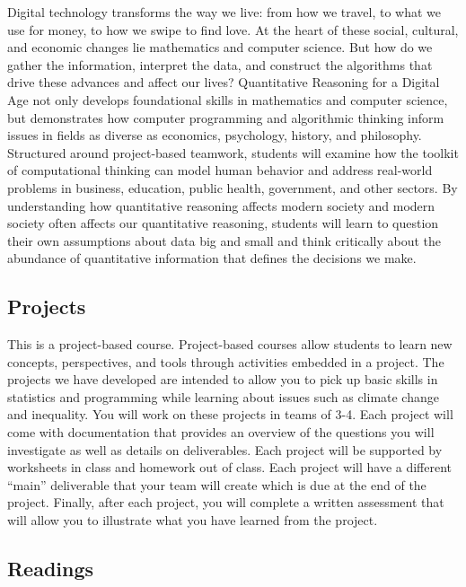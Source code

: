 \documentclass[
]{article}
\begin{document}
Digital technology transforms the way we live: from how we travel, to what we use for money, to how we swipe to find love.
At the heart of these social, cultural, and economic changes lie mathematics and computer science. But how do we gather the information, interpret the data, and construct the algorithms that drive these advances and affect our lives? Quantitative Reasoning for a Digital Age not only develops foundational skills in mathematics and computer science, but demonstrates how computer programming and algorithmic thinking inform issues in fields as diverse as economics, psychology, history, and philosophy. Structured around project-based teamwork, students will examine how the toolkit of computational thinking can model human behavior and address real-world problems in business, education, public health, government, and other sectors. By understanding how quantitative reasoning affects modern society and modern society often affects our quantitative reasoning, students will learn to question their own assumptions about data big and small and think critically about the abundance of quantitative information that defines the decisions we make.

\hypertarget{projects}{%
\subsection*{Projects}\label{projects}}

This is a project-based course. Project-based courses allow students to learn new concepts, perspectives, and tools through activities embedded in a project. The projects we have developed are intended to allow you to pick up basic skills in statistics and programming while learning about issues such as climate change and inequality.
You will work on these projects in teams of 3-4. Each project will come with documentation that provides an overview of the questions you will investigate as well as details on deliverables. Each project will be supported by worksheets in class and homework out of class. Each project will have a different ``main'' deliverable that your team will create which is due at the end of the project. Finally, after each project, you will complete a written assessment that will allow you to illustrate what you have learned from the project.

\hypertarget{readings}{%
\subsection*{Readings}\label{readings}}
\end{document}
